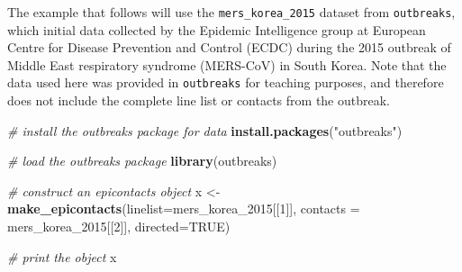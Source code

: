 \documentclass[9pt,a4paper,]{extarticle}
\newenvironment{Shaded}{\begin{snugshade}}{\end{snugshade}}
\newcommand{\KeywordTok}[1]{\textcolor[rgb]{0.13,0.29,0.53}{\textbf{#1}}}
\newcommand{\DataTypeTok}[1]{\textcolor[rgb]{0.13,0.29,0.53}{#1}}
\newcommand{\DecValTok}[1]{\textcolor[rgb]{0.00,0.00,0.81}{#1}}
\newcommand{\StringTok}[1]{\textcolor[rgb]{0.31,0.60,0.02}{#1}}
\newcommand{\CommentTok}[1]{\textcolor[rgb]{0.56,0.35,0.01}{\textit{#1}}}
\newcommand{\OtherTok}[1]{\textcolor[rgb]{0.56,0.35,0.01}{#1}}
\newcommand{\NormalTok}[1]{#1}
\theoremstyle{definition}
\theoremstyle{definition}
\theoremstyle{definition}
\theoremstyle{remark}
\begin{document}
The example that follows will use the \texttt{mers\_korea\_2015} dataset from \texttt{outbreaks}, which initial data collected by the Epidemic Intelligence group at European Centre for Disease Prevention and Control (ECDC) during the 2015 outbreak of Middle East respiratory syndrome (MERS-CoV) in South Korea. Note that the data used here was provided in \texttt{outbreaks} for teaching purposes, and therefore does not include the complete line list or contacts from the outbreak.

\begin{Shaded}
\begin{Highlighting}[]
\CommentTok{# install the outbreaks package for data}
\KeywordTok{install.packages}\NormalTok{(}\StringTok{"outbreaks"}\NormalTok{)}
\end{Highlighting}
\end{Shaded}

\begin{Shaded}
\begin{Highlighting}[]
\CommentTok{# load the outbreaks package}
\KeywordTok{library}\NormalTok{(outbreaks)}

\CommentTok{# construct an epicontacts object}
\NormalTok{x <-}\StringTok{ }\KeywordTok{make_epicontacts}\NormalTok{(}\DataTypeTok{linelist=}\NormalTok{mers_korea_}\DecValTok{2015}\NormalTok{[[}\DecValTok{1}\NormalTok{]],}
                      \DataTypeTok{contacts =}\NormalTok{ mers_korea_}\DecValTok{2015}\NormalTok{[[}\DecValTok{2}\NormalTok{]],}
                      \DataTypeTok{directed=}\OtherTok{TRUE}\NormalTok{)}

\CommentTok{# print the object   }
\NormalTok{x               }
\end{Highlighting}
\end{Shaded}
\end{document}
